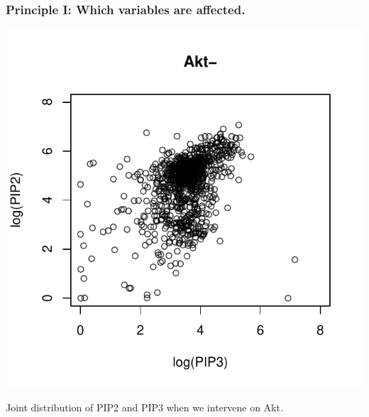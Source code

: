 \documentclass{beamer}
\begin{document}
\begin{frame}
\frametitle{Principle I: Which variables are affected.}

\begin{center}
\includegraphics[scale = 0.5]{../images/plot01_02.pdf}
\end{center}

Joint distribution of PIP2 and PIP3 when we intervene on Akt.

\end{frame}
\end{document}
